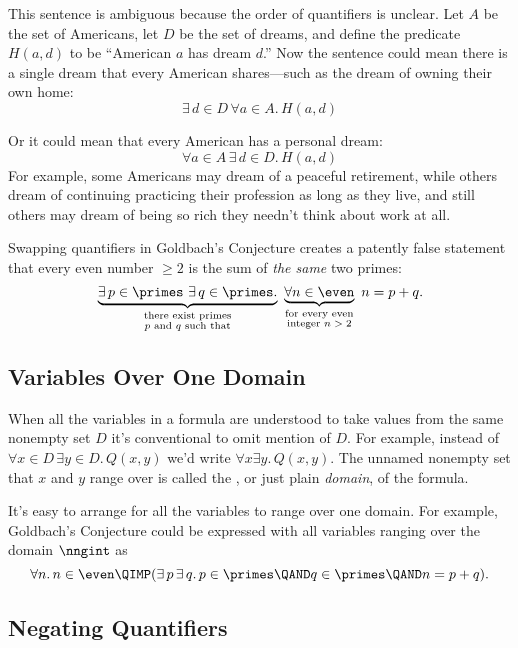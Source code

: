 This sentence is ambiguous because the order of quantifiers is
unclear.  Let $A$ be the set of Americans, let $D$ be the set of
dreams, and define the predicate $H(a, d)$ to be ``American $a$ has
dream $d$.''  Now the sentence could mean there is a single dream
that every American shares---such as the dream of owning their own
home:
\[
\exists\, d \in D\, \forall a \in A.\, H(a, d)
\]

Or it could mean that every American has a personal dream:
\[
\forall a \in A\, \exists\, d \in D.\, H(a, d)
\]
For example, some Americans may dream of a peaceful retirement, while
others dream of continuing practicing their profession as long as they
live, and still others may dream of being so rich they needn't think
about work at all.

Swapping quantifiers in Goldbach's Conjecture creates a patently false
statement that every even number $\geq 2$ is the sum of \emph{the same}
two primes:
\[
\underbrace{\exists\, p \in \primes\ \exists\, q \in \primes.}_{\substack
    {\text{there exist primes} \\
     \text{$p$ and $q$ such that}}}
\
\underbrace{\forall n \in \even}_{\substack
    {\text{for every even} \\
     \text{integer $n > 2$}}}
\ n = p + q.
\]

\subsection{Variables Over One Domain}
When all the variables in a formula are understood to take values from the
same nonempty set $D$ it's conventional to omit mention of $D$.  For
example, instead of $\forall x \in D\, \exists y \in D.\, Q(x,y)$ we'd
write $\forall x \exists y.\, Q(x,y)$.  The unnamed nonempty set that $x$
and $y$ range over is called the \term{domain of discourse}, or just plain
\emph{domain}, of the formula.

It's easy to arrange for all the variables to range over one domain.  For
example, Goldbach's Conjecture could be expressed with all variables
ranging over the domain $\nngint$ as
\[
\forall n.\, n \in \even \QIMP (\exists\, p\, \exists\, q.\, p \in \primes \QAND
q \in \primes \QAND n = p + q).
\]

\subsection{Negating Quantifiers}\label{negquant_sec}

